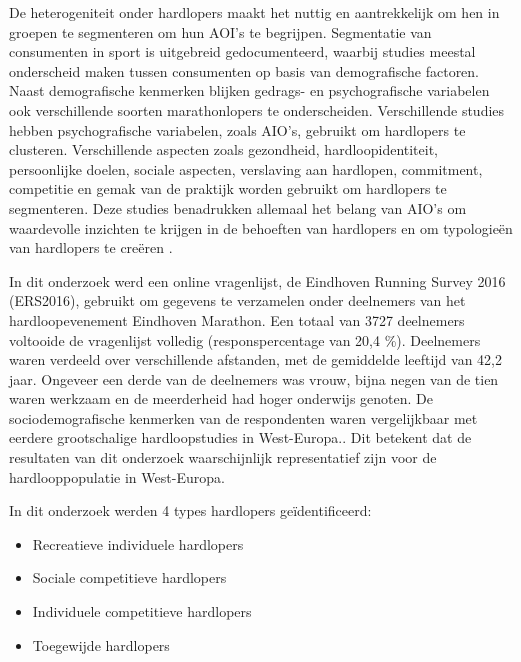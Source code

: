    De heterogeniteit onder hardlopers maakt het nuttig en aantrekkelijk om hen in groepen te segmenteren om hun AOI's te begrijpen. 
    Segmentatie van consumenten in sport is uitgebreid gedocumenteerd, waarbij studies meestal onderscheid maken tussen consumenten 
    op basis van demografische factoren. Naast demografische kenmerken blijken gedrags- en psychografische variabelen ook 
    verschillende soorten marathonlopers te onderscheiden. Verschillende studies hebben psychografische variabelen, zoals AIO's, 
    gebruikt om hardlopers te clusteren. Verschillende aspecten zoals gezondheid, hardloopidentiteit, persoonlijke doelen, sociale aspecten, 
    verslaving aan hardlopen, commitment, competitie en gemak van de praktijk worden gebruikt om hardlopers te segmenteren.
    Deze studies benadrukken allemaal het belang van AIO's om waardevolle inzichten te krijgen in de behoeften van hardlopers 
    en om typologieën van hardlopers te creëren \textcite{Janssen2020}. 


    In dit onderzoek werd een online vragenlijst, de Eindhoven Running Survey 2016 (ERS2016), 
    gebruikt om gegevens te verzamelen onder deelnemers van het hardloopevenement Eindhoven Marathon. 
    Een totaal van 3727 deelnemers voltooide de vragenlijst volledig (responspercentage van 20,4 \%). 
    Deelnemers waren verdeeld over verschillende afstanden, met de gemiddelde leeftijd van 42,2 jaar. 
    Ongeveer een derde van de deelnemers was vrouw, bijna negen van de tien waren werkzaam en de meerderheid had hoger onderwijs genoten. 
    De sociodemografische kenmerken van de respondenten waren vergelijkbaar met eerdere grootschalige hardloopstudies in West-Europa.\textcite{Janssen2020}.
    Dit betekent dat de resultaten van dit onderzoek waarschijnlijk representatief zijn voor de hardlooppopulatie in West-Europa.


    In dit onderzoek werden 4 types hardlopers geïdentificeerd:
    \begin{itemize}
        \item Recreatieve individuele hardlopers
        \item Sociale competitieve hardlopers
        \item Individuele competitieve hardlopers
        \item Toegewijde hardlopers
    \end{itemize}



